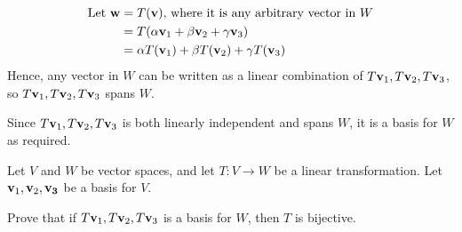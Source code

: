 \documentclass[10pt]{article}
\newcommand{\noin}{\noindent}
\begin{document}
{{\begin{spacing}{1.5}
\begin{center}
        \vspace{-24pt}
        \begin{align*}
            \text{Let }{\bf w}&=T({\bf v})\text{, where it is any arbitrary vector in }W\\
            &= T(\alpha {\bf v}_1 + \beta {\bf v}_2 + \gamma {\bf v}_3) \\
            &= \alpha T({\bf v}_1) + \beta T({\bf v}_2) + \gamma T({\bf v}_3)
        \end{align*}
        Hence, any vector in $W$ can be written as a linear combination of $T{\bf v}_1, T{\bf v}_2, T{\bf v}_3$, so $T{\bf v}_1, T{\bf v}_2, T{\bf v}_3$ spans $W$.
    \end{center}
    \centering
    Since $T{\bf v}_1, T{\bf v}_2, T{\bf v}_3$ is both linearly independent and spans $W$, it is a basis for $W$ as required.
    \end{spacing}
	}
}

\pagebreak

\noin{\bf 3.}    Let $V$ and $W$ be vector spaces, and let $T: V \to W$ be a linear transformation. Let ${\bf v}_1, {\bf v}_2, {\bf v_3}$ be a basis for $V$.

\vspace{20pt}

\noin{(b)}  Prove that if $T{\bf v}_1, T{\bf v}_2, T{\bf v}_3$ is a basis for $W$, then $T$ is bijective.

    
\end{document}
